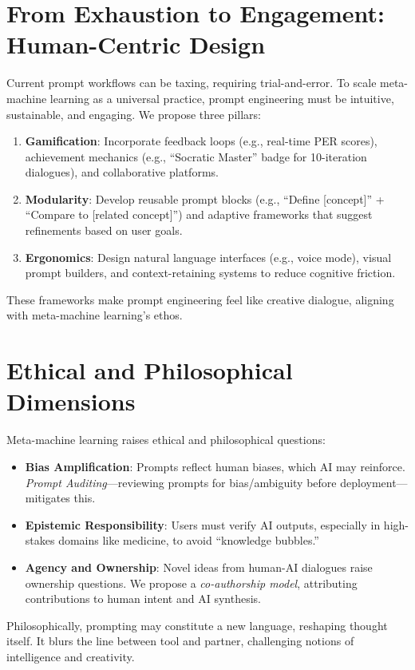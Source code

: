 \documentclass{article}
\begin{document}
\section{From Exhaustion to Engagement: Human-Centric Design}
Current prompt workflows can be taxing, requiring trial-and-error. To scale meta-machine learning as a universal practice, prompt engineering must be intuitive, sustainable, and engaging. We propose three pillars:
\begin{enumerate}
    \item \textbf{Gamification}: Incorporate feedback loops (e.g., real-time PER scores), achievement mechanics (e.g., ``Socratic Master'' badge for 10-iteration dialogues), and collaborative platforms.
    \item \textbf{Modularity}: Develop reusable prompt blocks (e.g., ``Define [concept]'' + ``Compare to [related concept]'') and adaptive frameworks that suggest refinements based on user goals.
    \item \textbf{Ergonomics}: Design natural language interfaces (e.g., voice mode), visual prompt builders, and context-retaining systems to reduce cognitive friction.
\end{enumerate}

These frameworks make prompt engineering feel like creative dialogue, aligning with meta-machine learning’s ethos.

\section{Ethical and Philosophical Dimensions}
Meta-machine learning raises ethical and philosophical questions:
\begin{itemize}
    \item \textbf{Bias Amplification}: Prompts reflect human biases, which AI may reinforce. \emph{Prompt Auditing}---reviewing prompts for bias/ambiguity before deployment---mitigates this.
    \item \textbf{Epistemic Responsibility}: Users must verify AI outputs, especially in high-stakes domains like medicine, to avoid ``knowledge bubbles.''
    \item \textbf{Agency and Ownership}: Novel ideas from human-AI dialogues raise ownership questions. We propose a \emph{co-authorship model}, attributing contributions to human intent and AI synthesis.
\end{itemize}

Philosophically, prompting may constitute a new language, reshaping thought itself. It blurs the line between tool and partner, challenging notions of intelligence and creativity.
\end{document}
